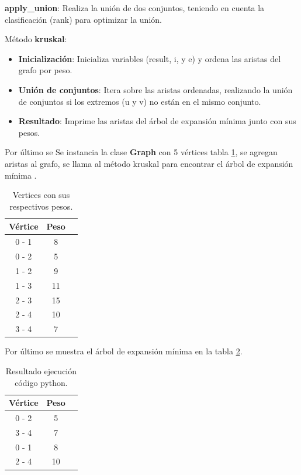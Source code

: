 \documentclass[12pt,a4paper]{article}
\begin{document}
\textbf{apply\_union}: Realiza la unión de dos conjuntos, teniendo en cuenta la clasificación (rank) para optimizar la unión.
\newline

Método \textbf{kruskal}:

\begin{itemize}
    \item \textbf{Inicialización}: Inicializa variables (result, i, y e) y ordena las aristas del grafo por peso.
    \item \textbf{Unión de conjuntos}: Itera sobre las aristas ordenadas, realizando la unión de conjuntos si los extremos (u y v) no están en el mismo conjunto.
    \item \textbf{Resultado}: Imprime las aristas del árbol de expansión mínima junto con sus pesos.
\end{itemize}

Por último se Se instancia la clase \textbf{Graph} con 5 vértices tabla \ref{tab: tabla1}, se agregan aristas al grafo, se llama al método kruskal para encontrar el árbol de expansión mínima .
\newline

\begin{table}[H]
\centering
\begin{tabular}{|c|c|c|}
\hline
\textbf{Vértice}  & \textbf{Peso}   \\ \hline
0 - 1 & 8  \\
0 - 2 & 5  \\
1 - 2 & 9  \\
1 - 3 & 11 \\
2 - 3 & 15 \\
2 - 4 & 10 \\
3 - 4 & 7 \\ \hline
\end{tabular}
\caption{Vertices con sus respectivos pesos.}
\label{tab: tabla1}
\end{table}

Por último se muestra el árbol de expansión mínima en la tabla \ref{tab: tabla2}.

\begin{table}[H]
\centering
\begin{tabular}{|c|c|c|}
\hline
\textbf{Vértice}  & \textbf{Peso}   \\ \hline

0 - 2 & 5  \\
3 - 4 & 7 \\
0 - 1 & 8  \\
2 - 4 & 10 \\ \hline
\end{tabular}
\caption{Resultado ejecución código python.}
\label{tab: tabla2}
\end{table}
\end{document}

